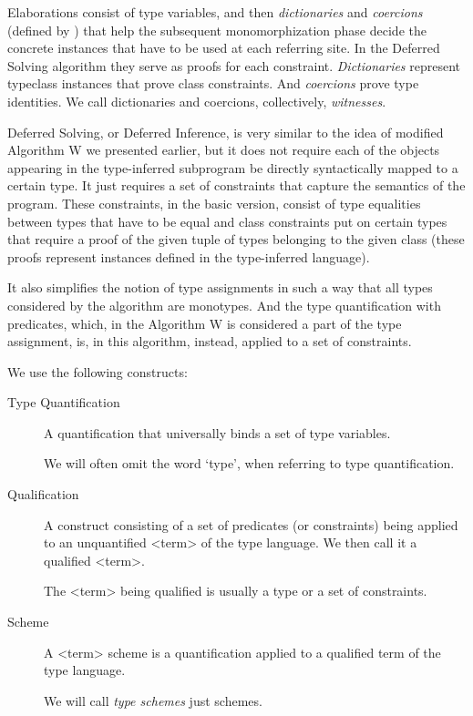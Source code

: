 Elaborations consist of type variables, and then \emph{dictionaries} and \emph{coercions} (defined by \citet{vytiniotis2011outsidein}) that help the subsequent monomorphization phase decide the concrete instances that have to be used at each referring site. In the Deferred Solving algorithm they serve as proofs for each constraint. \emph{Dictionaries} represent typeclass instances that prove class constraints. And \emph{coercions} prove type identities. We call dictionaries and coercions, collectively, \emph{witnesses}.

Deferred Solving, or Deferred Inference, is very similar to the idea of modified Algorithm W we presented earlier, but it does not require each of the objects appearing in the type-inferred subprogram be directly syntactically mapped to a certain type. It just requires a set of constraints that capture the semantics of the program. These constraints, in the basic version, consist of type equalities between types that have to be equal and class constraints put on certain types that require a proof of the given tuple of types belonging to the given class (these proofs represent instances defined in the type-inferred language).

It also simplifies the notion of type assignments in such a way that all types considered by the algorithm are monotypes. And the type quantification with predicates, which, in the Algorithm W is considered a part of the type assignment, is, in this algorithm, instead, applied to a set of constraints.

We use the following constructs:


\begin{description}
    \item[Type Quantification] A quantification that universally binds a set of type variables.

    We will often omit the word `type', when referring to type quantification.

    \item[Qualification] A construct consisting of a set of predicates (or constraints) being applied to an unquantified <term> of the type language. We then call it a qualified <term>.

    The <term> being qualified is usually a type or a set of constraints.

    \item[Scheme] A <term> scheme is a quantification applied to a qualified term of the type language.

    We will call \emph{type schemes} just schemes.
\end{description}

